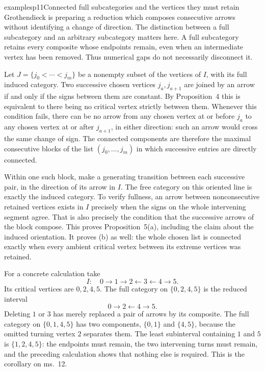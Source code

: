 \begin{dcomment}{examples}{p11}{Connected full subcategories and the vertices they must retain}
Grothendieck is preparing a reduction which composes consecutive arrows without identifying a change of direction. The distinction between a full subcategory and an arbitrary subcategory matters here. A full subcategory retains every composite whose endpoints remain, even when an intermediate vertex has been removed. Thus numerical gaps do not necessarily disconnect it.

Let $J=\{j_0<\cdots<j_m\}$ be a nonempty subset of the vertices of $I$, with its full induced category. Two successive chosen vertices $j_a,j_{a+1}$ are joined by an arrow if and only if the signs between them are constant. By Proposition~4 this is equivalent to there being no critical vertex strictly between them. Whenever this condition fails, there can be no arrow from any chosen vertex at or before $j_a$ to any chosen vertex at or after $j_{a+1}$, in either direction: such an arrow would cross the same change of sign. The connected components are therefore the maximal consecutive blocks of the list $(j_0,\ldots,j_m)$ in which successive entries are directly connected.

Within one such block, make a generating transition between each successive pair, in the direction of its arrow in $I$. The free category on this oriented line is exactly the induced category. To verify fullness, an arrow between nonconsecutive retained vertices exists in $I$ precisely when the signs on the whole intervening segment agree. That is also precisely the condition that the successive arrows of the block compose. This proves Proposition~5(a), including the claim about the induced orientation. It proves (b) as well: the whole chosen list is connected exactly when every ambient critical vertex between its extreme vertices was retained.

For a concrete calculation take
\[
 I:\quad0\longrightarrow1\longrightarrow2
       \longleftarrow3\longleftarrow4\longrightarrow5.
\]
Its critical vertices are $0,2,4,5$. The full category on $\{0,2,4,5\}$ is the reduced interval
\[
 0\longrightarrow2\longleftarrow4\longrightarrow5.
\]
Deleting $1$ or $3$ has merely replaced a pair of arrows by its composite. The full category on $\{0,1,4,5\}$ has two components, $\{0,1\}$ and $\{4,5\}$, because the omitted turning vertex $2$ separates them. The least subinterval containing $1$ and $5$ is $\{1,2,4,5\}$: the endpoints must remain, the two intervening turns must remain, and the preceding calculation shows that nothing else is required. This is the corollary on ms.~12.


\end{dcomment}
